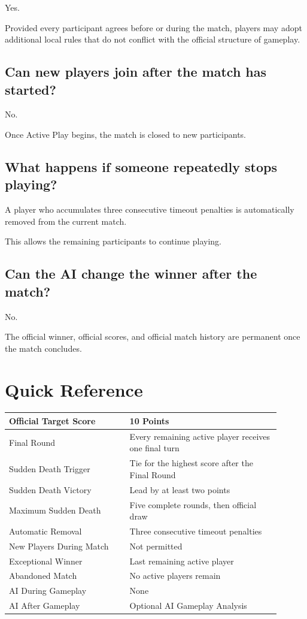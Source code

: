 \documentclass[11pt,a4paper]{article}
\begin{document}
Yes.

Provided every participant agrees before or during the match, players may adopt additional local rules that do not conflict with the official structure of gameplay.

\subsection*{Can new players join after the match has started?}

No.

Once Active Play begins, the match is closed to new participants.

\subsection*{What happens if someone repeatedly stops playing?}

A player who accumulates three consecutive timeout penalties is automatically removed from the current match.

This allows the remaining participants to continue playing.

\subsection*{Can the AI change the winner after the match?}

No.

The official winner, official scores, and official match history are permanent once the match concludes.

\section{Quick Reference}

\begin{center}
\begin{tabular}{p{0.40\linewidth}p{0.50\linewidth}}
\toprule
Official Target Score & 10 Points\\
\midrule
Final Round & Every remaining active player receives one final turn\\
\midrule
Sudden Death Trigger & Tie for the highest score after the Final Round\\
\midrule
Sudden Death Victory & Lead by at least two points\\
\midrule
Maximum Sudden Death & Five complete rounds, then official draw\\
\midrule
Automatic Removal & Three consecutive timeout penalties\\
\midrule
New Players During Match & Not permitted\\
\midrule
Exceptional Winner & Last remaining active player\\
\midrule
Abandoned Match & No active players remain\\
\midrule
AI During Gameplay & None\\
\midrule
AI After Gameplay & Optional AI Gameplay Analysis\\
\bottomrule
\end{tabular}
\end{center}
\end{document}
